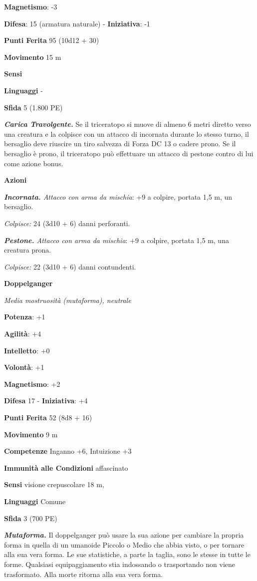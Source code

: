 \begin{multicols}{2}
\textbf{Magnetismo}: -3

\textbf{Difesa}: 15 (armatura naturale) - \textbf{Iniziativa}: -1

\textbf{Punti Ferita} 95 (10d12 + 30)

\textbf{Movimento} 15 m

\textbf{Sensi} 

\textbf{Linguaggi} -

\textbf{Sfida} 5 (1.800 PE)

\emph{\textbf{Carica Travolgente.}} Se il triceratopo si muove di almeno
6 metri diretto verso una creatura e la colpisce con un attacco di
incornata durante lo stesso turno, il bersaglio deve riuscire un tiro
salvezza di Forza DC 13 o cadere prono. Se il bersaglio è prono, il
triceratopo può effettuare un attacco di pestone contro di lui come
azione bonus.

\textbf{Azioni}

\emph{\textbf{Incornata.} Attacco con arma da mischia}: +9 a colpire,
portata 1,5 m, un bersaglio.

\emph{Colpisce:} 24 (3d10 + 6) danni perforanti.

\emph{\textbf{Pestone.} Attacco con arma da mischia}: +9 a colpire,
portata 1,5 m, una creatura prona.

\emph{Colpisce:} 22 (3d10 + 6) danni contundenti.



\textbf{Doppelganger}

\emph{Media mostruosità (mutaforma), neutrale}

\textbf{Potenza}: +1

\textbf{Agilità}: +4

\textbf{Intelletto}: +0

\textbf{Volontà}: +1

\textbf{Magnetismo}: +2

\textbf{Difesa} 17 - \textbf{Iniziativa}: +4

\textbf{Punti Ferita} 52 (8d8 + 16)

\textbf{Movimento} 9 m

\textbf{Competenze} Inganno +6, Intuizione +3

\textbf{Immunità alle Condizioni} affascinato

\textbf{Sensi} visione crepuscolare 18 m, 

\textbf{Linguaggi} Comune

\textbf{Sfida} 3 (700 PE)

\emph{\textbf{Mutaforma.}} Il doppelganger può usare la sua azione per
cambiare la propria forma in quella di un umanoide Piccolo o Medio che
abbia visto, o per tornare alla sua vera forma. Le sue statistiche, a
parte la taglia, sono le stesse in tutte le forme. Qualsiasi
equipaggiamento stia indossando o trasportando non viene trasformato.
Alla morte ritorna alla sua vera forma.


\end{multicols}
